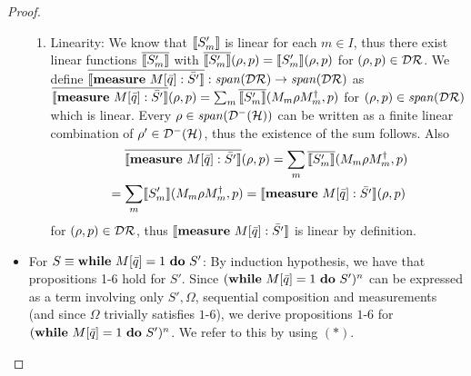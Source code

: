 \documentclass[a4paper,UKenglish,cleveref, autoref, thm-restate]{lipics-v2021}
\begin{document}
\begin{proof}
\begin{itemize}
\begin{enumerate}
            \item Linearity:
            We know that $\llbracket S'_m \rrbracket$ is linear for each $m\in I$, thus there exist linear functions $\overline{\llbracket S'_m \rrbracket}$ with $\overline{\llbracket S'_m \rrbracket}(\rho,p) = \llbracket S'_m \rrbracket(\rho,p)$ for $(\rho,p)\in \mathcal{D}\mathcal{R}$. We define $\overline{\llbracket \mathbf{measure } \text{ }M[\Bar{q}]:\Bar{S'} \rrbracket}: \mathit{span}(\mathcal{D}\mathcal{R}) \to \mathit{span}(\mathcal{D}\mathcal{R})$ as $\overline{\llbracket \mathbf{measure } \text{ }M[\Bar{q}]:\Bar{S'} \rrbracket}(\rho,p) = \sum_m \overline{\llbracket S'_m \rrbracket}(M_m \rho M_m ^\dagger,p)$ for $(\rho,p) \in \mathit{span}(\mathcal{D}\mathcal{R})$ which is linear. Every $\rho\in \mathit{span}(\mathcal{D}^- (\mathcal{H}))$ can be written as a finite linear combination of $\rho'\in \mathcal{D}^- (\mathcal{H})$, thus the existence of the sum follows.
             Also
            \begin{align*}
                &\phantom{=.}\overline{\llbracket \mathbf{measure } \text{ }M[\Bar{q}]:\Bar{S'} \rrbracket}(\rho,p) =  \sum_m \overline{\llbracket S'_m \rrbracket}(M_m \rho M_m ^\dagger,p) \\
                &= \sum_m \llbracket S'_m \rrbracket(M_m \rho M_m^\dagger,p) = \llbracket \mathbf{measure } \text{ }M[\Bar{q}]:\Bar{S'} \rrbracket(\rho,p)
            \end{align*}
            for $(\rho,p) \in \mathcal{D}\mathcal{R}$, thus $\llbracket \mathbf{measure } \text{ }M[\Bar{q}]:\Bar{S'} \rrbracket$ is linear by definition.
        \end{enumerate}
        \item For $S \equiv \mathbf{while } \text{ }M[\Bar{q}]=1 \text{ }\mathbf{ do } \text{ }S'$:
        By induction hypothesis, we have that propositions 1-6 hold for $S'$. Since $(\mathbf{while } \text{ }M[\Bar{q}]=1 \text{ }\mathbf{ do } \text{ }S')^n$ can be expressed as a term involving only $S',\Omega$, sequential composition and measurements (and since $\Omega$ trivially satisfies $1$-$6$), we derive propositions $1$-$6$ for $(\mathbf{while } \text{ }M[\Bar{q}]=1 \text{ }\mathbf{ do } \text{ }S')^n$. We refer to this by using $(*)$.


\end{itemize}
\end{proof}
\end{document}
